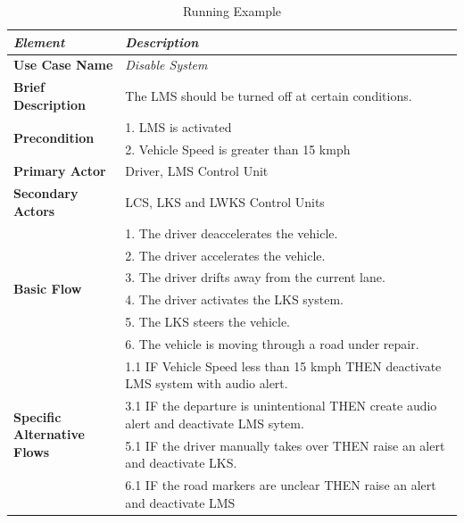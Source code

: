 \begin{table}[htbp]
  \centering
  \caption{Running Example}
    \begin{adjustbox}{width=1\textwidth}
    \begin{tabular}{|l|l|l|l|l|l|l|l|}
    \toprule
    \textit{\textbf{Element}} & \multicolumn{7}{l|}{\textit{\textbf{ Description}}} \\
    \midrule
    \textbf{Use Case Name} & \multicolumn{7}{l|}{\textit{Disable System}} \\
    \midrule
    \textbf{Brief Description } & \multicolumn{7}{l|}{The LMS should be turned off at certain conditions.} \\
    \midrule
    \multirow{2}[4]{*}{\textbf{Precondition}} & \multicolumn{7}{l|}{1. LMS is activated} \\
\cmidrule{2-8}          & \multicolumn{7}{l|}{2. Vehicle Speed is greater than 15 kmph} \\
    \midrule
    \textbf{Primary Actor } & \multicolumn{7}{l|}{Driver, LMS Control Unit} \\
    \midrule
    \textbf{Secondary Actors} & \multicolumn{7}{l|}{LCS, LKS and LWKS Control Units} \\
    \midrule
    \multirow{6}[12]{*}{\textbf{Basic Flow}} & \multicolumn{7}{l|}{1. The driver deaccelerates the vehicle.} \\
\cmidrule{2-8}          & \multicolumn{7}{l|}{2. The driver accelerates the vehicle.} \\
\cmidrule{2-8}          & \multicolumn{7}{l|}{3. The driver drifts away from the current lane.} \\
\cmidrule{2-8}          & \multicolumn{7}{l|}{4. The driver activates the LKS system.} \\
\cmidrule{2-8}          & \multicolumn{7}{l|}{5. The LKS steers the vehicle.} \\
\cmidrule{2-8}          & \multicolumn{7}{l|}{6. The vehicle is moving through a road under repair.} \\
    \midrule
    \multicolumn{1}{|l|}{\multirow{4}[8]{*}{\textbf{Specific \newline{} Alternative Flows}}} & \multicolumn{7}{l|}{1.1 IF Vehicle Speed less than 15 kmph THEN deactivate LMS system with audio alert.} \\
\cmidrule{2-8}          & \multicolumn{7}{l|}{3.1 IF the departure is unintentional THEN create audio alert and deactivate LMS sytem.} \\
\cmidrule{2-8}          & \multicolumn{7}{l|}{5.1 IF the driver manually takes over THEN raise an alert and deactivate LKS.} \\
\cmidrule{2-8}          & \multicolumn{7}{l|}{6.1 IF the road markers are unclear THEN raise an alert and deactivate LMS} \\
    \bottomrule
    \bottomrule
    \end{tabular}%
    \end{adjustbox}
  \label{tab:runningexample}%
\end{table}%



